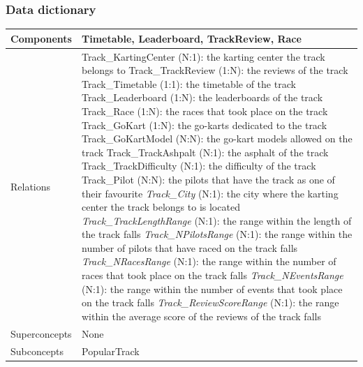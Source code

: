 \documentclass{beamer}
\begin{document}
\begin{frame}
\frametitle{Data dictionary}
\begin{table}
\tiny
\begin{tabular}{|p{2cm}|p{6cm}|}
\hline
Components & 
Timetable, Leaderboard, TrackReview, Race \\
\hline
Relations &
Track\_KartingCenter (N:1): the karting center the track belongs to \newline
Track\_TrackReview (1:N): the reviews of the track \newline
Track\_Timetable (1:1): the timetable of the track \newline
Track\_Leaderboard (1:N): the leaderboards of the track \newline
Track\_Race (1:N): the races that took place on the track \newline
Track\_GoKart (1:N): the go-karts dedicated to the track \newline
Track\_GoKartModel (N:N): the go-kart models allowed on the track \newline
Track\_TrackAshpalt (N:1): the asphalt of the track \newline
Track\_TrackDifficulty (N:1): the difficulty of the track \newline
Track\_Pilot (N:N): the pilots that have the track as one of their favourite \newline
\textit{Track\_City} (N:1): the city where the karting center the track belongs to is located \newline
\textit{Track\_TrackLengthRange} (N:1): the range within the length of the track falls \newline
\textit{Track\_NPilotsRange} (N:1): the range within the number of pilots that have raced on the track falls \newline
\textit{Track\_NRacesRange} (N:1): the range within the number of races that took place on the track falls \newline
\textit{Track\_NEventsRange} (N:1): the range within the number of events that took place on the track falls \newline
\textit{Track\_ReviewScoreRange} (N:1): the range within the average score of the reviews of the track falls \\
\hline
Superconcepts & None \\
\hline
Subconcepts & 
PopularTrack \\
\hline
\end{tabular}
\end{table}
\end{frame}
\end{document}
